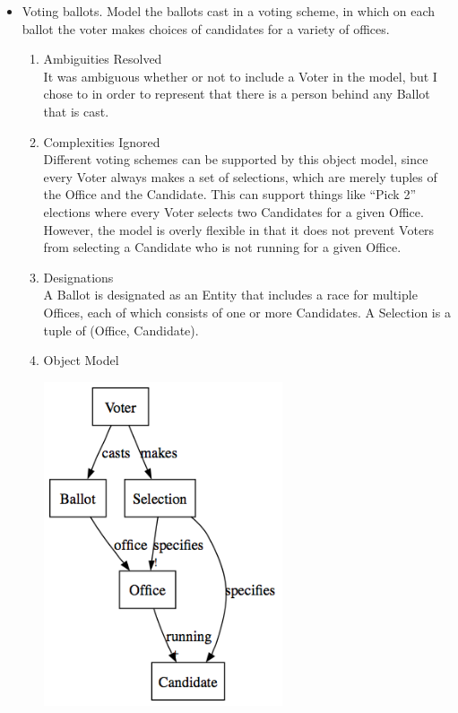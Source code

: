 \documentclass[11pt,letterpaper]{article}
\begin{document}
\begin{itemize}
\item Voting ballots. Model the ballots cast in a voting scheme, in which on each ballot the voter makes choices of candidates for a variety of offices.

\begin{enumerate}
\item Ambiguities Resolved\\
It was ambiguous whether or not to include a Voter in the model, but I chose to in order to represent that there is a person behind any Ballot that is cast.
\item Complexities Ignored\\
Different voting schemes can be supported by this object model, since every Voter always makes a set of selections, which are merely tuples of the Office and the Candidate. This can support things like ``Pick 2'' elections where every Voter selects two Candidates for a given Office. However, the model is overly flexible in that it does not prevent Voters from selecting a Candidate who is not running for a given Office.
\item Designations\\
A Ballot is designated as an Entity that includes a race for multiple Offices, each of which consists of one or more Candidates. 
A Selection is a tuple of (Office, Candidate).
\item Object Model\\
\begin{center}
\includegraphics[width=200pt]{dot/b3.png}
\label{fig:ob3} 
\end{center}
\end{enumerate}


\end{itemize}
\end{document}
